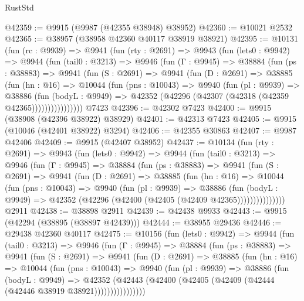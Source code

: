 \begin{lexlean}{RustStd}
\begin{coremodule}
@42359 := @9915 (@9987 (@42355 @38948) @38952)
@42360 := @10021 @2532
@42365 := @38957 (@38958 @42360 @40117 @38919 @38921)
@42395 := @10131
    (fun (rc : @9939) =>
    @9941
      (fun (rty : @2691) =>
      @9943
        (fun (lets0 : @9942) =>
        @9944
          (fun (tail0 : @3213) =>
          @9946
            (fun (Γ : @9945) =>
            @38884
              (fun (ps : @38883) =>
              @9941
                (fun (S : @2691) =>
                @9941
                  (fun (D : @2691) =>
                  @38885
                    (fun (hn : @16) =>
                    @10044
                      (fun (pns : @10043) =>
                      @9940
                        (fun (pl : @9939) =>
                        @38886
                          (fun (bodyL : @9949) =>
                          @42352 (@42296 (@42307 (@42318 (@42359 @42365))))))))))))))))
    @7423
@42396 := @42302 @7423
@42400 := @9915 (@38908 (@42396 @38922) @38929)
@42401 := @42313 @7423
@42405 := @9915 (@10046 (@42401 @38922) @3294)
@42406 := @42355 @30863
@42407 := @9987 @42406
@42409 := @9915 (@42407 @38952)
@42437 := @10134
    (fun (rty : @2691) =>
    @9943
      (fun (lets0 : @9942) =>
      @9944
        (fun (tail0 : @3213) =>
        @9946
          (fun (Γ : @9945) =>
          @38884
            (fun (ps : @38883) =>
            @9941
              (fun (S : @2691) =>
              @9941
                (fun (D : @2691) =>
                @38885
                  (fun (hn : @16) =>
                  @10044
                    (fun (pns : @10043) =>
                    @9940
                      (fun (pl : @9939) =>
                      @38886
                        (fun (bodyL : @9949) =>
                        @42352 (@42296 (@42400 (@42405 (@42409 @42365)))))))))))))))
    @2911
@42438 := @38898 @2911
@42439 := @42438 @9933
@42443 := @9915 (@42294 (@38895 (@38897 @42439)))
@42444 := @38955 @29436
@42446 := @29438 @42360 @40117
@42475 := @10156
    (fun (lets0 : @9942) =>
    @9944
      (fun (tail0 : @3213) =>
      @9946
        (fun (Γ : @9945) =>
        @38884
          (fun (ps : @38883) =>
          @9941
            (fun (S : @2691) =>
            @9941
              (fun (D : @2691) =>
              @38885
                (fun (hn : @16) =>
                @10044
                  (fun (pns : @10043) =>
                  @9940
                    (fun (pl : @9939) =>
                    @38886
                      (fun (bodyL : @9949) =>
                      @42352
                        (@42443
                          (@42400 (@42405 (@42409 (@42444 (@42446 @38919 @38921))))))))))))))))

\end{coremodule}
\end{lexlean}
